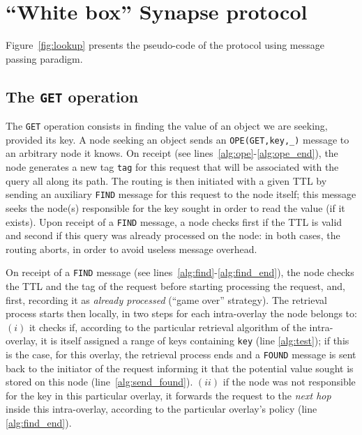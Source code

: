 

\section{``White box'' Synapse protocol }
%
Figure~\ref{fig:lookup} presents the pseudo-code of the protocol using
message passing paradigm. 


 
\subsection{The \texttt{GET} operation}
%
The {\tt GET} operation consists in finding the value of an object we
are seeking, provided its key. A node seeking an object sends an
\texttt{OPE(GET,key,\_)} message to an arbitrary node it knows. On
receipt (see lines~\ref{alg:ope}-\ref{alg:ope_end}), the node
generates a new tag {\tt tag} for this request that will be associated
with the query all along its path. The routing is then initiated with
a given TTL by sending an auxiliary {\tt FIND} message for this
request to the node itself; this message seeks the node(s) responsible
for the key sought in order to read the value (if it exists). Upon
receipt of a {\tt FIND} message, a node checks first if the TTL is
valid and second if this query was already processed on the node: in
both cases, the routing aborts, in order to avoid useless message
overhead.

%



On receipt of a {\tt FIND} message (see
lines~\ref{alg:find}-\ref{alg:find_end}), the node checks the TTL and
the tag of the request before starting processing the request, and,
first, recording it as \emph{already processed} (``game over''
strategy). The retrieval process starts then locally, in two steps for
each intra-overlay the node belongs to: $(i)$ it checks if, according
to the particular retrieval algorithm of the intra-overlay, it is
itself assigned a range of keys containing {\tt key} (line
\ref{alg:test}); if this is the case, for this overlay, the retrieval
process ends and a {\tt FOUND} message is sent back to the initiator
of the request informing it that the potential value sought is stored
on this node (line~\ref{alg:send_found}). $(ii)$ if the node was not
responsible for the key in this particular overlay, it forwards the
request to the \emph{next hop} inside this intra-overlay, according to
the particular overlay's policy (line \ref{alg:find_end}).

